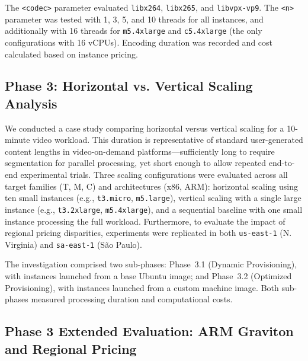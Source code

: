 \documentclass[conference]{IEEEtran}
\begin{document}
The \texttt{<codec>} parameter evaluated \texttt{libx264}, \texttt{libx265},
and \texttt{libvpx-vp9}. The \texttt{<n>} parameter was tested with 1, 3, 5, and 10 threads for all instances, and additionally with 16 threads for \texttt{m5.4xlarge} and \texttt{c5.4xlarge} (the only configurations with 16 vCPUs). Encoding duration was recorded and cost calculated based on
instance pricing.

\subsection{Phase 3: Horizontal vs. Vertical Scaling Analysis}

We conducted a case study comparing horizontal versus vertical scaling for a
10-minute video workload. This duration is representative of standard
user-generated content lengths in video-on-demand platforms---sufficiently long
to require segmentation for parallel processing, yet short enough to allow
repeated end-to-end experimental trials. Three scaling configurations were
evaluated across all target families (T, M, C) and architectures (x86, ARM): horizontal scaling using ten small instances (e.g., \texttt{t3.micro}, \texttt{m5.large}), vertical scaling with a single large instance (e.g., \texttt{t3.2xlarge}, \texttt{m5.4xlarge}), and a sequential baseline with one small instance processing the full workload. Furthermore, to evaluate the impact of regional pricing disparities, experiments were replicated in both \texttt{us-east-1} (N. Virginia) and \texttt{sa-east-1} (São Paulo).

The investigation comprised two sub-phases: Phase~3.1 (Dynamic Provisioning), with
instances launched from a base Ubuntu image; and Phase~3.2 (Optimized Provisioning), with
instances launched from a custom machine image. Both sub-phases measured
processing duration and computational costs.

\subsection{Phase 3 Extended Evaluation: ARM Graviton and Regional Pricing}
\end{document}
